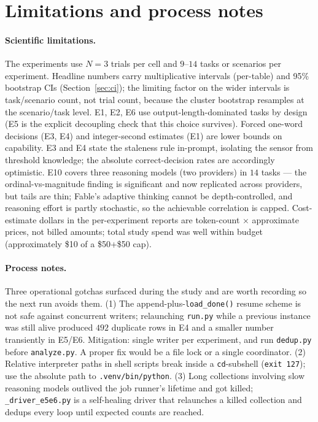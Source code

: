 \documentclass[11pt]{article}
\newcommand{\code}[1]{\texttt{\small #1}}
\begin{document}
\section{Limitations and process notes}
\label{sec:process}

\paragraph{Scientific limitations.} The experiments use $N = 3$ trials per cell and
$9$--$14$ tasks or scenarios per experiment. Headline numbers carry multiplicative intervals
(per-table) and 95\% bootstrap CIs (Section~\ref{sec:ci}); the limiting factor on the wider
intervals is task/scenario count, not trial count, because the cluster bootstrap resamples at
the scenario/task level. E1, E2, E6 use output-length-dominated tasks by design (E5 is the
explicit decoupling check that this choice survives). Forced one-word decisions (E3, E4) and
integer-second estimates (E1) are lower bounds on capability. E3 and E4 state the staleness
rule in-prompt, isolating the sensor from threshold knowledge; the absolute correct-decision
rates are accordingly optimistic. E10 covers three reasoning models (two providers) in $14$
tasks --- the ordinal-vs-magnitude finding is significant and now replicated across providers,
but tails are thin; Fable's adaptive thinking cannot be depth-controlled, and reasoning effort
is partly stochastic, so the achievable correlation is capped. Cost-estimate dollars in the
per-experiment
reports are token-count $\times$ approximate prices, not billed amounts; total study spend
was well within budget (approximately \$10 of a \$50+\$50 cap).

\paragraph{Process notes.} Three operational gotchas surfaced during the study and are worth
recording so the next run avoids them. (1) The append-plus-\code{load\_done()} resume scheme
is not safe against concurrent writers; relaunching \code{run.py} while a previous instance
was still alive produced $492$ duplicate rows in E4 and a smaller number transiently in E5/E6.
Mitigation: single writer per experiment, and run \code{dedup.py} before \code{analyze.py}.
A proper fix would be a file lock or a single coordinator. (2) Relative interpreter paths in
shell scripts break inside a \code{cd}-subshell (\code{exit 127}); use the absolute path to
\code{.venv/bin/python}. (3) Long collections involving slow reasoning models outlived the
job runner's lifetime and got killed; \code{\_driver\_e5e6.py} is a self-healing driver that
relaunches a killed collection and dedups every loop until expected counts are reached.
\end{document}
